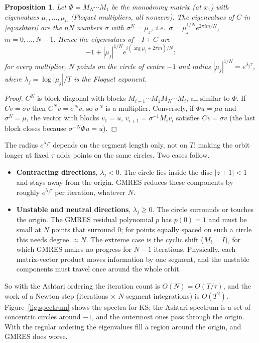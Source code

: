 \documentclass[11pt,a4paper]{article}
\newtheorem{proposition}{Proposition}
\begin{document}
\begin{proposition}\label{prop:spectrum}
Let $\Phi = M_N \cdots M_1$ be the monodromy matrix (at $x_1$) with eigenvalues $\mu_1,\dots,\mu_n$ (Floquet multipliers, all nonzero). The eigenvalues of $C$ in \eqref{eq:ashtari} are the $nN$ numbers $\sigma$ with $\sigma^N = \mu_j$, i.e.\ $\sigma = \mu_j^{1/N} e^{2\pi i m/N}$, $m = 0,\dots,N-1$. Hence the eigenvalues of $-I + C$ are
\[
-1 + |\mu_j|^{1/N} e^{i(\arg\mu_j + 2\pi m)/N}:
\]
for every multiplier, $N$ points on the circle of centre $-1$ and radius $|\mu_j|^{1/N} = e^{\lambda_j \tau}$, where $\lambda_j = \log|\mu_j|/T$ is the Floquet exponent.
\end{proposition}

\begin{proof}
$C^N$ is block diagonal with blocks $M_{i-1}\cdots M_1 M_N \cdots M_i$, all similar to $\Phi$. If $Cv = \sigma v$ then $C^N v = \sigma^N v$, so $\sigma^N$ is a multiplier. Conversely, if $\Phi u = \mu u$ and $\sigma^N = \mu$, the vector with blocks $v_1 = u$, $v_{i+1} = \sigma^{-1} M_i v_i$ satisfies $Cv = \sigma v$ (the last block closes because $\sigma^{-N}\Phi u = u$).
\end{proof}

The radius $e^{\lambda_j\tau}$ depends on the segment length only, not on $T$: making the orbit longer at fixed $\tau$ adds points on the same circles. Two cases follow.

\begin{itemize}
\item \textbf{Contracting directions}, $\lambda_j < 0$. The circle lies inside the disc $|z+1| < 1$ and stays away from the origin. GMRES reduces these components by roughly $e^{\lambda_j\tau}$ per iteration, whatever $N$.
\item \textbf{Unstable and neutral directions}, $\lambda_j \ge 0$. The circle surrounds or touches the origin. The GMRES residual polynomial $p$ has $p(0) = 1$ and must be small at $N$ points that surround $0$; for points equally spaced on such a circle this needs degree $\approx N$. The extreme case is the cyclic shift ($M_i = I$), for which GMRES makes no progress for $N-1$ iterations. Physically, each matrix-vector product moves information by one segment, and the unstable components must travel once around the whole orbit.
\end{itemize}

So with the Ashtari ordering the iteration count is $O(N) = O(T/\tau)$, and the work of a Newton step (iterations $\times$ $N$ segment integrations) is $O(T^2)$. Figure~\ref{fig:spectrum} shows the spectra for KS: the Ashtari spectrum is a set of concentric circles around $-1$, and the outermost ones pass through the origin. With the regular ordering the eigenvalues fill a region around the origin, and GMRES does worse.
\end{document}
